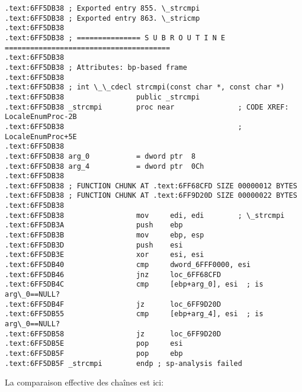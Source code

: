\begin{lstlisting}[style=customasmx86]
.text:6FF5DB38 ; Exported entry 855. \_strcmpi
.text:6FF5DB38 ; Exported entry 863. \_stricmp
.text:6FF5DB38
.text:6FF5DB38 ; =============== S U B R O U T I N E =======================================
.text:6FF5DB38
.text:6FF5DB38 ; Attributes: bp-based frame
.text:6FF5DB38
.text:6FF5DB38 ; int \_\_cdecl strcmpi(const char *, const char *)
.text:6FF5DB38                 public _strcmpi
.text:6FF5DB38 _strcmpi        proc near               ; CODE XREF: LocaleEnumProc-2B
.text:6FF5DB38                                         ; LocaleEnumProc+5E
.text:6FF5DB38
.text:6FF5DB38 arg_0           = dword ptr  8
.text:6FF5DB38 arg_4           = dword ptr  0Ch
.text:6FF5DB38
.text:6FF5DB38 ; FUNCTION CHUNK AT .text:6FF68CFD SIZE 00000012 BYTES
.text:6FF5DB38 ; FUNCTION CHUNK AT .text:6FF9D20D SIZE 00000022 BYTES
.text:6FF5DB38
.text:6FF5DB38                 mov     edi, edi        ; \_strcmpi
.text:6FF5DB3A                 push    ebp
.text:6FF5DB3B                 mov     ebp, esp
.text:6FF5DB3D                 push    esi
.text:6FF5DB3E                 xor     esi, esi
.text:6FF5DB40                 cmp     dword_6FFF0000, esi
.text:6FF5DB46                 jnz     loc_6FF68CFD
.text:6FF5DB4C                 cmp     [ebp+arg_0], esi  ; is arg\_0==NULL?
.text:6FF5DB4F                 jz      loc_6FF9D20D
.text:6FF5DB55                 cmp     [ebp+arg_4], esi  ; is arg\_0==NULL?
.text:6FF5DB58                 jz      loc_6FF9D20D
.text:6FF5DB5E                 pop     esi
.text:6FF5DB5F                 pop     ebp
.text:6FF5DB5F _strcmpi        endp ; sp-analysis failed
\end{lstlisting}

La comparaison effective des chaînes est ici:

